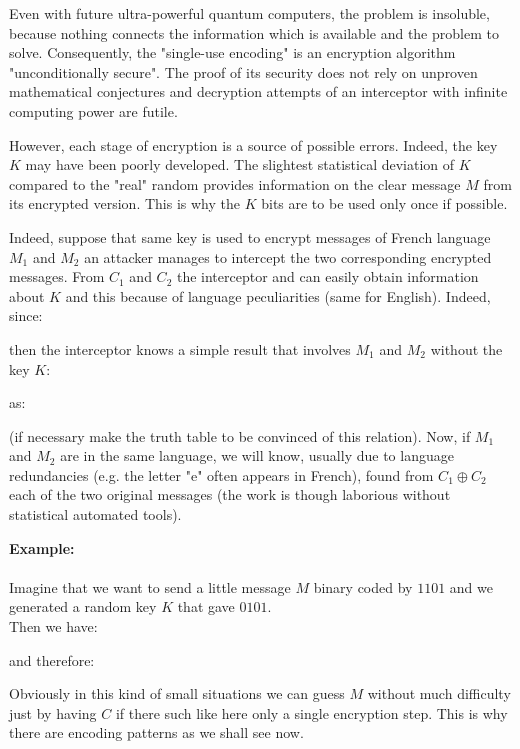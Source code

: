 	Even with future ultra-powerful quantum computers, the problem is insoluble, because nothing connects the information which is available and the problem to solve. Consequently, the "single-use encoding" is an encryption algorithm "unconditionally secure". The proof of its security does not rely on unproven mathematical conjectures and decryption attempts of an interceptor with infinite computing power are futile.
	
	However, each stage of encryption is a source of possible errors. Indeed, the key $K$ may have been poorly developed. The slightest statistical deviation of $K$ compared to the "real" random provides information on the clear message $M$ from its encrypted version. This is why the $K$ bits are to be used only once if possible.
	
	Indeed, suppose that same key is used to encrypt messages of French language $M_1$ and $M_2$ an attacker manages to intercept the two corresponding encrypted messages. From $C_1$ and $C_2$ the interceptor and can easily obtain information about $K$ and this because of language peculiarities (same for English). Indeed, since:
	
	then the interceptor knows a simple result that involves $M_1$ and $M_2$ without the key $K$:
	
	as:
	
	(if necessary make the truth table to be convinced of this relation). Now, if $M_1$ and $M_2$ are in the same language, we will know, usually due to language redundancies (e.g. the letter "e" often appears in French), found from $C_1\oplus C_2$ each of the two original messages (the work is though laborious without statistical automated tools).
	
	\begin{tcolorbox}[colframe=black,colback=white,sharp corners]
	\textbf{{\Large {}}Example:}\\\\
	Imagine that we want to send a little message $M$ binary coded by $1101$ and we generated a random key $K$ that gave $0101$.\\
	
	Then we have:
	
	and therefore:
	
	\end{tcolorbox}
	Obviously in this kind of small situations we can guess $M$ without much difficulty just by having $C$ if there such like here only a single encryption step. This is why there are encoding patterns as we shall see now.
	
